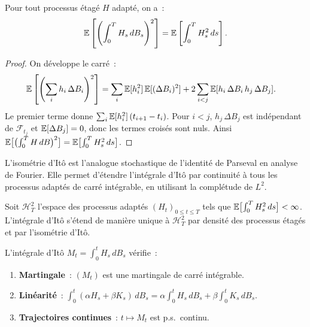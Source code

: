 \begin{theoreme}
\label{thm:isometrie}
Pour tout processus \'etag\'e $H$ adapt\'e, on a~:
\[
  \mathbb{E}\left[\left(\int_0^T H_s\, dB_s\right)^2\right]
  = \mathbb{E}\left[\int_0^T H_s^2\, ds\right].
\]
\end{theoreme}

\begin{proof}
On d\'eveloppe le carr\'e~:
\begin{align*}
  \mathbb{E}\left[\left(\sum_{i} h_i\,\Delta B_i\right)^2\right]
  &= \sum_{i} \mathbb{E}[h_i^2]\,\mathbb{E}[(\Delta B_i)^2]
    + 2\sum_{i < j} \mathbb{E}[h_i\,\Delta B_i\, h_j\,\Delta B_j].
\end{align*}
Le premier terme donne $\sum_i \mathbb{E}[h_i^2]\,(t_{i+1} - t_i)$.
Pour $i < j$, $h_j\,\Delta B_j$ est ind\'ependant de $\mathcal{F}_{t_j}$
et $\mathbb{E}[\Delta B_j] = 0$, donc les termes crois\'es sont nuls.
Ainsi $\mathbb{E}\bigl[\bigl(\int_0^T H\,dB\bigr)^2\bigr]
= \mathbb{E}\bigl[\int_0^T H_s^2\,ds\bigr]$.
\end{proof}

\begin{intuition}
L'isom\'etrie d'It\^o est l'analogue stochastique de l'identit\'e de
Parseval en analyse de Fourier. Elle permet d'\'etendre l'int\'egrale
d'It\^o par continuit\'e \`a tous les processus adapt\'es de carr\'e int\'egrable,
en utilisant la compl\'etude de $L^2$.
\end{intuition}

\begin{definition}[Extension \`a $L^2$]
Soit $\mathcal{H}^2_T$ l'espace des processus adapt\'es $(H_t)_{0 \leq t \leq T}$
tels que $\mathbb{E}\bigl[\int_0^T H_s^2\,ds\bigr] < \infty$. L'int\'egrale d'It\^o
s'\'etend de mani\`ere unique \`a $\mathcal{H}^2_T$ par densit\'e des processus
\'etag\'es et par l'isom\'etrie d'It\^o.
\end{definition}

\begin{proposition}
\label{prop:proprietes_ito}
L'int\'egrale d'It\^o $M_t = \int_0^t H_s\,dB_s$ v\'erifie~:
\begin{enumerate}
  \item \textbf{Martingale}~: $(M_t)$ est une martingale de carr\'e int\'egrable.
  \item \textbf{Lin\'earit\'e}~: $\int_0^t (\alpha H_s + \beta K_s)\,dB_s
    = \alpha \int_0^t H_s\,dB_s + \beta \int_0^t K_s\,dB_s$.
  \item \textbf{Trajectoires continues}~: $t \mapsto M_t$ est p.s.\ continu.
\end{enumerate}
\end{proposition}

